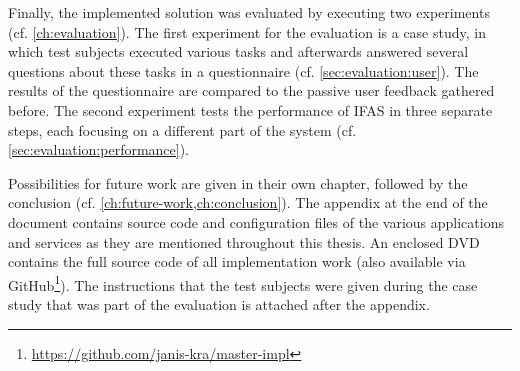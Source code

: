 Finally, the implemented solution was evaluated by executing two experiments (cf. \cref{ch:evaluation}).
The first experiment for the evaluation is a case study, in which test subjects executed various tasks and afterwards answered several questions about these tasks in a questionnaire (cf. \cref{sec:evaluation:user}).
The results of the questionnaire are compared to the passive user feedback gathered before.
The second experiment tests the performance of \ac{IFAS} in three separate steps, each focusing on a different part of the system (cf. \cref{sec:evaluation:performance}).

Possibilities for future work are given in their own chapter, followed by the conclusion (cf. \cref{ch:future-work,ch:conclusion}).
The appendix at the end of the document contains source code and configuration files of the various applications and services as they are mentioned throughout this thesis.
An enclosed DVD contains the full source code of all implementation work (also available via GitHub\footnote{\url{https://github.com/janis-kra/master-impl}}).
The instructions that the test subjects were given during the case study that was part of the evaluation is attached after the appendix.
